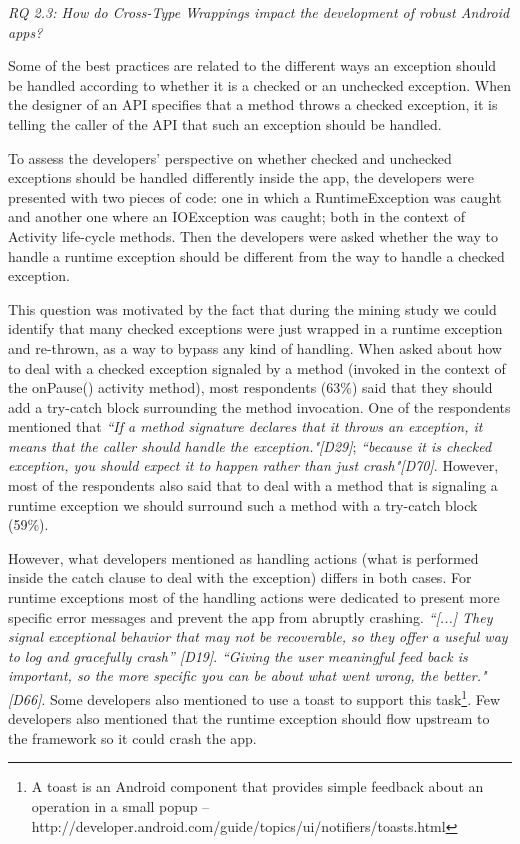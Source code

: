 \bigskip 


\bigskip 
\noindent\emph{RQ 2.3: How do Cross-Type Wrappings impact the development of robust Android apps?}

\bigskip

Some of the best practices are related to the different ways an exception should be handled according to whether it is a checked or an unchecked exception. When the designer of an API specifies that a method throws a checked exception, it is telling the caller of the API that such an exception should be handled. 

To assess the developers' perspective on whether checked and unchecked exceptions should be handled differently inside the app, the developers were presented with two pieces of code: one in which a RuntimeException was caught and another one where an IOException was caught; both in the context of Activity life-cycle methods. Then the developers were asked whether the way to handle a runtime exception should be different from the way to handle a checked exception. 

This question was motivated by the fact that during the mining study we could identify that many checked exceptions were just wrapped in a runtime exception and re-thrown, as a way to bypass any kind of handling. When asked about how to deal with a checked exception signaled by a method (invoked in the context of the onPause() activity method), most respondents (63\%) said that they should add a try-catch block surrounding the method invocation. One of the respondents mentioned that \emph{``If a method signature declares that it throws an exception, it means that the caller should handle the exception."[D29]}; \emph{``because it is checked exception, you should expect it to happen rather than just crash"[D70]}. However, most of the respondents also said that to deal with a method that is signaling a runtime exception we should surround such a method with a try-catch block (59\%). 

However, what developers mentioned as handling actions (what is performed inside the catch clause to deal with the exception) differs in both cases. For runtime exceptions most of the handling actions were dedicated to present more specific error messages and prevent the app from abruptly crashing. \emph{``[...] They signal exceptional behavior that may not be recoverable, so they offer a useful way to log and gracefully crash'' [D19]}. \emph{``Giving the user meaningful feed back is important, so the more specific you can be about what went wrong, the better."[D66]}. Some developers also mentioned to use a toast to support this task\footnote{A toast is an Android component that provides simple feedback about an operation in a small popup -- http://developer.android.com/guide/topics/ui/notifiers/toasts.html}. Few developers also mentioned that the runtime exception should flow upstream to the framework so it could crash the app.

